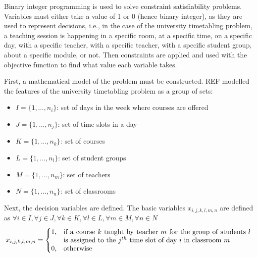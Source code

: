 \documentclass[a4paper, 12pt]{report}
\begin{document}
Binary integer programming is used to solve constraint satisfiability problems.
Variables must either take a value of 1 or 0 (hence binary integer), as they 
are used to represent decisions, i.e., in the case of the university 
timetabling problem, a teaching session is happening in a specific room, at a 
specific time, on a specific day, with a specific teacher, with a specific 
teacher, with a specific student group, about a specific module, or not.
Then constraints are applied and used with the objective function to find what
value each variable takes.

First, a mathematical model of the problem must be constructed. REF modelled 
the features of the university timetabling problem as a group of sets:
\begin{itemize}
	\item
		\begin{math}
			I = \{ 1, \dots , n_i \}
		\end{math}: set of days in the week where courses are offered
	\item
		\begin{math}
			J = \{ 1, \dots , n_j \}
		\end{math}: set of time slots in a day
	\item 
		\begin{math}
			K = \{ 1, \dots , n_k \}
		\end{math}: set of courses
	\item 
		\begin{math}
			L = \{ 1, \dots , n_l \}
		\end{math}: set of student groups
	\item 
		\begin{math}
			M = \{ 1, \dots , n_m \}
		\end{math}: set of teachers
	\item 
		\begin{math}
			N = \{ 1, \dots , n_n \}
		\end{math}: set of classrooms
\end{itemize}

Next, the decision variables are defined. The basic variables
\begin{math}
	x_{i,j,k,l,m,n}
\end{math}
are defined as
\begin{math}
	\forall i \in I, \forall j \in J, \forall k \in K, \forall l \in L, \forall
	m \in M, \forall n \in N
\end{math}
\begin{align*}
	x_{i,j,k,l,m,n} = 
	\begin{cases}
		1, & \parbox[t]{9.5cm}{if a course \( k \) taught by teacher \( m \) for
		the group of students \( l \) is assigned to the \( j^{th} \) time slot 
		of day \( i \) in classroom \( m \)} \\
		0, & \text{otherwise}
	\end{cases}
\end{align*}
\end{document}
